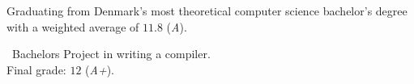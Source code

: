 Graduating from Denmark's most theoretical computer science bachelor's degree with a weighted average of $11.8$ (\emph{A}).

\medskip

\faFileO\ Bachelors Project in writing a compiler. \\ Final grade: $12$ (\emph{A+}).
